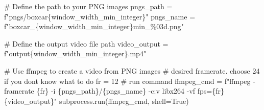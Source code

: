 \documentclass[
  letterpaper,
  DIV=11,
  numbers=noendperiod,
  oneside]{scrreprt}
\newenvironment{Shaded}{\begin{snugshade}}{\end{snugshade}}
\newcommand{\CommentTok}[1]{\textcolor[rgb]{0.37,0.37,0.37}{#1}}
\newcommand{\DecValTok}[1]{\textcolor[rgb]{0.68,0.00,0.00}{#1}}
\newcommand{\NormalTok}[1]{\textcolor[rgb]{0.00,0.23,0.31}{#1}}
\newcommand{\OperatorTok}[1]{\textcolor[rgb]{0.37,0.37,0.37}{#1}}
\newcommand{\SpecialCharTok}[1]{\textcolor[rgb]{0.37,0.37,0.37}{#1}}
\newcommand{\SpecialStringTok}[1]{\textcolor[rgb]{0.13,0.47,0.30}{#1}}
\newcommand{\VariableTok}[1]{\textcolor[rgb]{0.07,0.07,0.07}{#1}}
\begin{document}
\begin{Shaded}
\begin{Highlighting}[]
\CommentTok{\# Define the path to your PNG images}
\NormalTok{pngs\_path }\OperatorTok{=} \SpecialStringTok{f"pngs/boxcar}\SpecialCharTok{\{}\NormalTok{window\_width\_min\_integer}\SpecialCharTok{\}}\SpecialStringTok{"}
\NormalTok{pngs\_name }\OperatorTok{=} \SpecialStringTok{f"boxcar\_}\SpecialCharTok{\{}\NormalTok{window\_width\_min\_integer}\SpecialCharTok{\}}\SpecialStringTok{min\_\%03d.png"}

\CommentTok{\# Define the output video file path}
\NormalTok{video\_output }\OperatorTok{=} \SpecialStringTok{f"output}\SpecialCharTok{\{}\NormalTok{window\_width\_min\_integer}\SpecialCharTok{\}}\SpecialStringTok{.mp4"}

\CommentTok{\# Use ffmpeg to create a video from PNG images}
\CommentTok{\# desired framerate. choose 24 if you don\textquotesingle{}t know what to do}
\NormalTok{fr }\OperatorTok{=} \DecValTok{12}
\CommentTok{\# run command}
\NormalTok{ffmpeg\_cmd }\OperatorTok{=} \SpecialStringTok{f"ffmpeg {-}framerate }\SpecialCharTok{\{}\NormalTok{fr}\SpecialCharTok{\}}\SpecialStringTok{ {-}i }\SpecialCharTok{\{}\NormalTok{pngs\_path}\SpecialCharTok{\}}\SpecialStringTok{/}\SpecialCharTok{\{}\NormalTok{pngs\_name}\SpecialCharTok{\}}\SpecialStringTok{ {-}c:v libx264 {-}vf fps=}\SpecialCharTok{\{}\NormalTok{fr}\SpecialCharTok{\}}\SpecialStringTok{ }\SpecialCharTok{\{}\NormalTok{video\_output}\SpecialCharTok{\}}\SpecialStringTok{"}
\NormalTok{subprocess.run(ffmpeg\_cmd, shell}\OperatorTok{=}\VariableTok{True}\NormalTok{)}
\end{Highlighting}
\end{Shaded}
\end{document}
